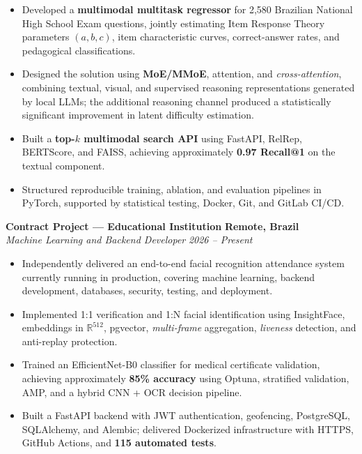 \documentclass[a4paper,10pt]{article}
\newcommand{\entry}[4]{%
    \noindent
    \textbf{#1}
    \hfill
    \textbf{#2}\\[-1pt]
    \textit{#3}
    \hfill
    \textit{#4}\par
}
\begin{document}
\begin{itemize}

    \item Developed a \textbf{multimodal multitask regressor} for
    2,580 Brazilian National High School Exam questions, jointly estimating
    Item Response Theory parameters $(a,b,c)$, item characteristic curves,
    correct-answer rates, and pedagogical classifications.

    \item Designed the solution using \textbf{MoE/MMoE}, attention, and
    \textit{cross-attention}, combining textual, visual, and supervised
    reasoning representations generated by local LLMs; the additional
    reasoning channel produced a statistically significant improvement in
    latent difficulty estimation.

    \item Built a \textbf{top-$k$ multimodal search API} using FastAPI,
    RelRep, BERTScore, and FAISS, achieving approximately
    \textbf{0.97 Recall@1} on the textual component.

    \item Structured reproducible training, ablation, and evaluation
    pipelines in PyTorch, supported by statistical testing, Docker, Git,
    and GitLab CI/CD.

\end{itemize}

\entry
    {Contract Project --- Educational Institution}
    {Remote, Brazil}
    {Machine Learning and Backend Developer}
    {2026 -- Present}

\begin{itemize}

    \item Independently delivered an end-to-end facial recognition
    attendance system currently running in production, covering machine
    learning, backend development, databases, security, testing, and
    deployment.

    \item Implemented 1:1 verification and 1:N facial identification using
    InsightFace, embeddings in $\mathbb{R}^{512}$, pgvector,
    \textit{multi-frame} aggregation, \textit{liveness} detection, and
    anti-replay protection.

    \item Trained an EfficientNet-B0 classifier for medical certificate
    validation, achieving approximately \textbf{85\% accuracy} using
    Optuna, stratified validation, AMP, and a hybrid CNN + OCR decision
    pipeline.

    \item Built a FastAPI backend with JWT authentication, geofencing,
    PostgreSQL, SQLAlchemy, and Alembic; delivered Dockerized
    infrastructure with HTTPS, GitHub Actions, and
    \textbf{115 automated tests}.

\end{itemize}
\end{document}
